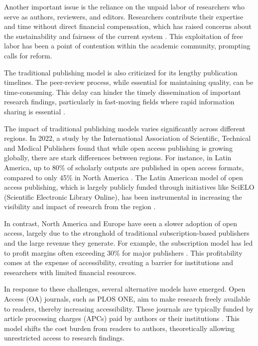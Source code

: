 \documentclass{article}
\begin{document}
Another important issue is the reliance on the unpaid labor of researchers who serve as authors, reviewers, and editors. Researchers contribute their expertise and time without direct financial compensation, which has raised concerns about the sustainability and fairness of the current system \cite{nicholas2015peer}. This exploitation of free labor has been a point of contention within the academic community, prompting calls for reform.

The traditional publishing model is also criticized for its lengthy publication timelines. The peer-review process, while essential for maintaining quality, can be time-consuming. This delay can hinder the timely dissemination of important research findings, particularly in fast-moving fields where rapid information sharing is essential \cite{kwon2020swamped}.

The impact of traditional publishing models varies significantly across different regions. In 2022, a study by the International Association of Scientific, Technical and Medical Publishers found that while open access publishing is growing globally, there are stark differences between regions. For instance, in Latin America, up to 80\% of scholarly outputs are published in open access formats, compared to only 45\% in North America \cite{international2022stm}. The Latin American model of open access publishing, which is largely publicly funded through initiatives like SciELO (Scientific Electronic Library Online), has been instrumental in increasing the visibility and impact of research from the region \cite{packer2014scielo}.

In contrast, North America and Europe have seen a slower adoption of open access, largely due to the stronghold of traditional subscription-based publishers and the large revenue they generate. For example, the subscription model has led to profit margins often exceeding 30\% for major publishers \cite{buranyi2017profitable}. This profitability comes at the expense of accessibility, creating a barrier for institutions and researchers with limited financial resources.

In response to these challenges, several alternative models have emerged. Open Access (OA) journals, such as PLOS ONE, aim to make research freely available to readers, thereby increasing accessibility. These journals are typically funded by article processing charges (APCs) paid by authors or their institutions \cite{plos}. This model shifts the cost burden from readers to authors, theoretically allowing unrestricted access to research findings.
\end{document}
